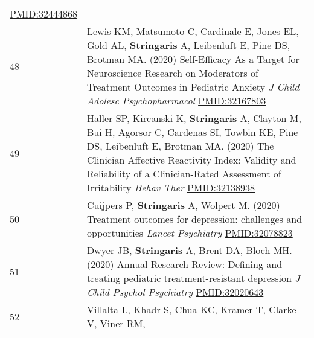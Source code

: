 \documentclass[
]{article}
\begin{document}
\begin{longtable}[]{@{}ll@{}}
\begin{minipage}[t]{0.94\columnwidth}
\url{PMID:32444868}\strut
\end{minipage}\tabularnewline
\begin{minipage}[t]{0.01\columnwidth}\raggedright
48\strut
\end{minipage} & \begin{minipage}[t]{0.94\columnwidth}\raggedright
Lewis KM, Matsumoto C, Cardinale E, Jones EL, Gold AL,
\textbf{Stringaris} A, Leibenluft E, Pine DS, Brotman MA. (2020)
Self-Efficacy As a Target for Neuroscience Research on Moderators of
Treatment Outcomes in Pediatric Anxiety \emph{J Child Adolesc
Psychopharmacol} \url{PMID:32167803}\strut
\end{minipage}\tabularnewline
\begin{minipage}[t]{0.01\columnwidth}\raggedright
49\strut
\end{minipage} & \begin{minipage}[t]{0.94\columnwidth}\raggedright
Haller SP, Kircanski K, \textbf{Stringaris} A, Clayton M, Bui H, Agorsor
C, Cardenas SI, Towbin KE, Pine DS, Leibenluft E, Brotman MA. (2020) The
Clinician Affective Reactivity Index: Validity and Reliability of a
Clinician-Rated Assessment of Irritability \emph{Behav Ther}
\url{PMID:32138938}\strut
\end{minipage}\tabularnewline
\begin{minipage}[t]{0.01\columnwidth}\raggedright
50\strut
\end{minipage} & \begin{minipage}[t]{0.94\columnwidth}\raggedright
Cuijpers P, \textbf{Stringaris} A, Wolpert M. (2020) Treatment outcomes
for depression: challenges and opportunities \emph{Lancet Psychiatry}
\url{PMID:32078823}\strut
\end{minipage}\tabularnewline
\begin{minipage}[t]{0.01\columnwidth}\raggedright
51\strut
\end{minipage} & \begin{minipage}[t]{0.94\columnwidth}\raggedright
Dwyer JB, \textbf{Stringaris} A, Brent DA, Bloch MH. (2020) Annual
Research Review: Defining and treating pediatric treatment-resistant
depression \emph{J Child Psychol Psychiatry} \url{PMID:32020643}\strut
\end{minipage}\tabularnewline
\begin{minipage}[t]{0.01\columnwidth}\raggedright
52\strut
\end{minipage} & \begin{minipage}[t]{0.94\columnwidth}\raggedright
Villalta L, Khadr S, Chua KC, Kramer T, Clarke V, Viner RM,

\end{minipage}
\end{longtable}
\end{document}
